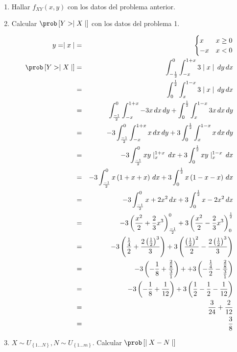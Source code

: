 \begin{enumerate}
\item Hallar $f_{XY} \left( x,y \right) $ con los datos del problema anterior.
\item Calcular $\prob \left[ Y > \mid X \mid \right]$ con los datos del problema 1.

\begin{eqnarray*}
y= \mid x \mid &=& \begin{cases}
x & x \geq 0\\
-x & x<0
\end{cases}\\
\prob \left[Y > \mid X \mid \right] &=& \int_{- \frac{1}{2}}^{0} \int _{-x}^{1+x} 3 \mid x \mid \, dy \, dx\\
&=& \int_{0}^{\frac{1}{2}} \int_{x}^{1-x} 3 \mid x \mid  \, dy \, dx\\
&=& \int _{\frac{-1}{2}}^{0} \int _{-x}^{1+x} -3x  \, dx \, dy + \int _{0}^{\frac{1}{2}} \int _{x}^{1-x} 3x \, dx \, dy\\
&=& -3 \int _{\frac{-1}{2}}^{0} \int _{-x}^{1+x} x  \, dx \, dy + 3 \int _{0}^{\frac{1}{2}} \int _{x}^{1-x} x \, dx \, dy\\
&=& -3 \int _{\frac{-1}{2}}^{0}  xy \mid_{x}^{1+x}  \, dx  + 3 \int _{0}^{\frac{1}{2}} xy \mid_{x}^{1-x}  \, dx \\
&=& -3 \int _{\frac{-1}{2}}^{0}  x \left(1+x+x \right) \, dx  + 3 \int _{0}^{\frac{1}{2}} x \left(1-x-x \right) \, dx \\
&=& -3 \int _{\frac{-1}{2}}^{0}  x+2x^{2} \, dx  + 3 \int _{0}^{\frac{1}{2}} x-2x^2 \, dx \\
&=& -3 \left(\frac{x^2}{2}+\frac{2}{3}x^{3} \right)_{\frac{-1}{2}}^{0}+  3 \left(\frac{x^2}{2}-\frac{2}{3}x^{3} \right)_{0}^{\frac{1}{2}}\\
&=& -3 \left(\frac{\frac{1}{4}}{2}+\frac{2\left(\frac{1}{2} \right)^3}{3} \right)+  3 \left(\frac{\left(\frac{1}{2} \right)^2}{2}-\frac{2\left(\frac{1}{2} \right)^3}{3} \right)\\
&=& -3 \left( - \frac{1}{8}+ \dfrac{\frac{2}{8}}{\frac{3}{1}} \right)+ +3 \left( - \dfrac{\frac{1}{4}}{2}- \dfrac{\frac{2}{8}}{\frac{3}{1}} \right)\\
&=& -3 \left( - \frac{1}{8} + \frac{1}{12} \right) + 3 \left( \frac{1}{2}- \frac{1}{2}- \frac{1}{12} \right)\\
&=& \frac{3}{24}+ \frac{2}{12}\\
&=& \frac{3}{8}
\end{eqnarray*}

\item $X\sim U_{\left\{ 1 \ldots N \right\}}, N \sim U_{\left\{ 1 \ldots m \right\}} $. Calcular $\prob \left[ \mid X-N \mid \right]$


\end{enumerate}
